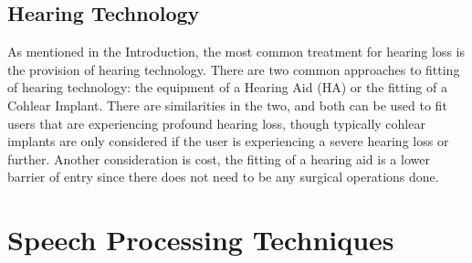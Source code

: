 \documentclass[logo,bsc,singlespacing,parskip,online]{infthesis}
\begin{document}
\subsection{Hearing Technology}
As mentioned in the Introduction, the most common treatment for hearing loss 
is the provision of hearing technology. There are two common approaches 
to fitting of hearing technology: the equipment of a Hearing Aid (HA) 
or the fitting of a Cohlear Implant. There are similarities in the 
two, and both can be used to fit users that are experiencing profound hearing loss, 
though typically cohlear implants are only considered if the user is experiencing 
a severe hearing loss or further. Another consideration is cost,
the fitting of a hearing aid is a lower barrier of entry since there 
does not need to be any surgical operations done. 


\section{Speech Processing Techniques}
\end{document}
